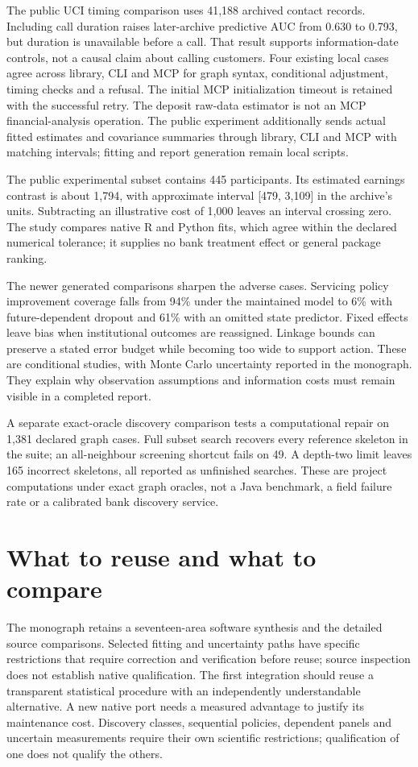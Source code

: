 The public UCI timing comparison uses 41,188 archived contact records.
Including call duration raises later-archive predictive AUC from 0.630 to
0.793, but duration is unavailable before a call. That result supports
information-date controls, not a causal claim about calling customers.
Four existing local cases agree across library, CLI and MCP for graph
syntax, conditional adjustment, timing checks and a refusal. The initial
MCP initialization timeout is retained with the successful retry. The
deposit raw-data estimator is not an MCP financial-analysis operation. The
public experiment additionally sends actual fitted estimates and covariance
summaries through library, CLI and MCP with matching intervals; fitting and
report generation remain local scripts.

The public experimental subset contains 445 participants. Its estimated
earnings contrast is about 1,794, with approximate interval [479, 3,109] in
the archive's units. Subtracting an illustrative cost of 1,000 leaves an
interval crossing zero. The study compares native R and Python fits, which
agree within the declared numerical tolerance; it supplies no bank treatment
effect or general package ranking.

The newer generated comparisons sharpen the adverse cases. Servicing policy
improvement coverage falls from 94\% under the maintained model to 6\% with
future-dependent dropout and 61\% with an omitted state predictor. Fixed
effects leave bias when institutional outcomes are reassigned. Linkage bounds
can preserve a stated error budget while becoming too wide to support action.
These are conditional studies, with Monte Carlo uncertainty reported in the
monograph. They explain why observation assumptions and information costs
must remain visible in a completed report.

A separate exact-oracle discovery comparison tests a computational repair on
1,381 declared graph cases. Full subset search recovers every reference
skeleton in the suite; an all-neighbour screening shortcut fails on 49.
A depth-two limit leaves 165 incorrect skeletons, all reported as unfinished
searches. These are project computations under exact graph oracles, not a
Java benchmark, a field failure rate or a calibrated bank discovery service.

\section*{What to reuse and what to compare}
The monograph retains a seventeen-area software synthesis and the detailed
source comparisons. Selected fitting and uncertainty paths have specific
restrictions that require correction and verification before reuse; source
inspection does not establish native qualification. The first integration
should reuse a transparent statistical procedure with an independently
understandable alternative.
A new native port needs a measured advantage to justify its maintenance
cost. Discovery classes, sequential policies, dependent panels and uncertain
measurements require their own scientific restrictions; qualification of
one does not qualify the others.

